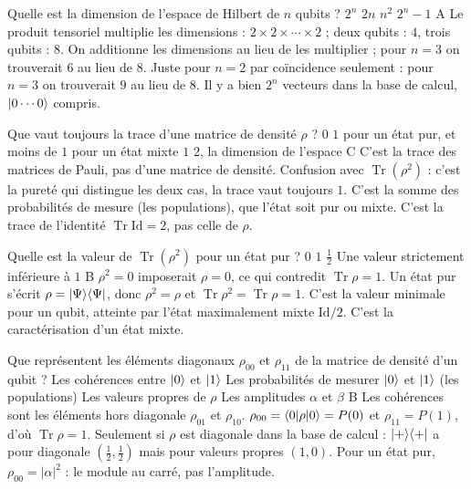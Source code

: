   {Quelle est la dimension de l'espace de Hilbert de $n$ qubits ?}
  {$2^n$}
  {$2n$}
  {$n^2$}
  {$2^n-1$}
  {A}
\qcmx
  {Le produit tensoriel multiplie les dimensions : $2\times2\times\cdots\times2$ ; deux qubits : $4$, trois qubits : $8$.}
  {On additionne les dimensions au lieu de les multiplier ; pour $n=3$ on trouverait $6$ au lieu de $8$.}
  {Juste pour $n=2$ par coïncidence seulement : pour $n=3$ on trouverait $9$ au lieu de $8$.}
  {Il y a bien $2^n$ vecteurs dans la base de calcul, $|0\cdots0\rangle$ compris.}

  {Que vaut toujours la trace d'une matrice de densité $\rho$ ?}
  {$0$}
  {$1$ pour un état pur, et moins de $1$ pour un état mixte}
  {$1$}
  {$2$, la dimension de l'espace}
  {C}
\qcmx
  {C'est la trace des matrices de Pauli, pas d'une matrice de densité.}
  {Confusion avec $\operatorname{Tr}(\rho^2)$ : c'est la pureté qui distingue les deux cas, la trace vaut toujours $1$.}
  {C'est la somme des probabilités de mesure (les populations), que l'état soit pur ou mixte.}
  {C'est la trace de l'identité $\operatorname{Tr}\mathrm{Id}=2$, pas celle de $\rho$.}

  {Quelle est la valeur de $\operatorname{Tr}(\rho^2)$ pour un état pur ?}
  {$0$}
  {$1$}
  {$\frac12$}
  {Une valeur strictement inférieure à $1$}
  {B}
\qcmx
  {$\rho^2=0$ imposerait $\rho=0$, ce qui contredit $\operatorname{Tr}\rho=1$.}
  {Un état pur s'écrit $\rho=|\Psi\rangle\langle \Psi|$, donc $\rho^2=\rho$ et $\operatorname{Tr}\rho^2=\operatorname{Tr}\rho=1$.}
  {C'est la valeur minimale pour un qubit, atteinte par l'état maximalement mixte $\mathrm{Id}/2$.}
  {C'est la caractérisation d'un état mixte.}

  {Que représentent les éléments diagonaux $\rho_{00}$ et $\rho_{11}$ de la matrice de densité d'un qubit ?}
  {Les cohérences entre $|0\rangle$ et $|1\rangle$}
  {Les probabilités de mesurer $|0\rangle$ et $|1\rangle$ (les populations)}
  {Les valeurs propres de $\rho$}
  {Les amplitudes $\alpha$ et $\beta$}
  {B}
\qcmx
  {Les cohérences sont les éléments hors diagonale $\rho_{01}$ et $\rho_{10}$.}
  {$\rho_{00}=\langle 0|\rho|0\rangle=P(0)$ et $\rho_{11}=P(1)$, d'où $\operatorname{Tr}\rho=1$.}
  {Seulement si $\rho$ est diagonale dans la base de calcul : $|+\rangle\langle +|$ a pour diagonale $(\frac12,\frac12)$ mais pour valeurs propres $(1,0)$.}
  {Pour un état pur, $\rho_{00}=|\alpha|^2$ : le module au carré, pas l'amplitude.}


